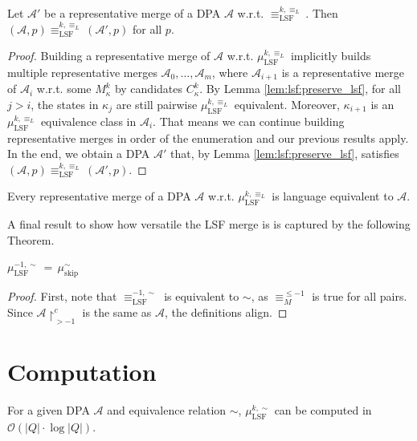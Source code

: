 \begin{theorem}
	Let $\mathcal{A}'$ be a representative merge of a DPA $\mathcal{A}$ w.r.t. $\equiv_\text{LSF}^{k,\equiv_L}$. Then $(\mathcal{A}, p) \equiv_\text{LSF}^{k,\equiv_L} (\mathcal{A}', p)$ for all $p$.
\end{theorem}

\begin{proof}
		Building a representative merge of $\mathcal{A}$ w.r.t. $\mu_\text{LSF}^{k,\equiv_L}$ implicitly builds multiple representative merges $\mathcal{A}_0, \dots, \mathcal{A}_m$, where $\mathcal{A}_{i+1}$ is a representative merge of $\mathcal{A}_i$ w.r.t. some $M^k_\kappa$ by candidates $C^k_\kappa$. By Lemma \ref{lem:lsf:preserve_lsf}, for all $j > i$, the states in $\kappa_j$ are still pairwise $\mu_\text{LSF}^{k,\equiv_L}$ equivalent. Moreover, $\kappa_{i+1}$ is an $\mu_\text{LSF}^{k,\equiv_L}$ equivalence class in $\mathcal{A}_i$. That means we can continue building representative merges in order of the enumeration and our previous results apply. In the end, we obtain a DPA $\mathcal{A}'$ that, by Lemma \ref{lem:lsf:preserve_lsf}, satisfies $(\mathcal{A}, p) \equiv_\text{LSF}^{k,\equiv_L} (\mathcal{A}', p)$.
\end{proof}

\begin{cor}
	Every representative merge of a DPA $\mathcal{A}$ w.r.t. $\mu_\text{LSF}^{k,\equiv_L}$ is language equivalent to $\mathcal{A}$.
\end{cor}

\vspace{10pt}

A final result to show how versatile the LSF merge is is captured by the following Theorem.

\begin{theorem}
	$\mu_\text{LSF}^{-1,\sim} \,=\, \mu_\text{skip}^\sim$
\end{theorem}

\begin{proof}
	First, note that $\equiv_\text{LSF}^{-1,\sim}$ is equivalent to $\sim$, as $\equiv_M^{\leq -1}$ is true for all pairs. Since $\mathcal{A} \upharpoonright^c_{> -1}$ is the same as $\mathcal{A}$, the definitions align.
\end{proof}


\section{Computation}
\begin{lem}
	For a given DPA $\mathcal{A}$ and equivalence relation $\sim$, $\mu_\text{LSF}^{k,\sim}$ can be computed in $\mathcal{O}(|Q| \cdot \log |Q|)$.
\end{lem}

